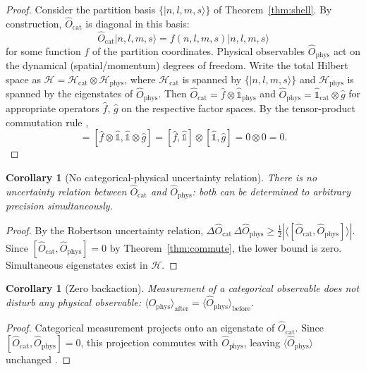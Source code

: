 \documentclass[10pt,twocolumn]{article}
\newtheorem{corollary}[theorem]{Corollary}
\theoremstyle{definition}
\theoremstyle{remark}
\newcommand{\Hil}{\mathcal{H}}
\newcommand{\Ocat}{\hat{O}_{\mathrm{cat}}}
\newcommand{\Ophys}{\hat{O}_{\mathrm{phys}}}
\begin{document}
\begin{proof}
Consider the partition basis
$\{|n,l,m,s\rangle\}$ of Theorem~\ref{thm:shell}.  By
construction, $\Ocat$ is diagonal in this basis:
\begin{equation}
  \Ocat|n,l,m,s\rangle = f(n,l,m,s)|n,l,m,s\rangle
\end{equation}
for some function $f$ of the partition coordinates.  Physical
observables $\Ophys$ act on the dynamical (spatial/momentum)
degrees of freedom.  Write the total Hilbert space as
$\Hil = \Hil_{\mathrm{cat}}\otimes\Hil_{\mathrm{phys}}$,
where $\Hil_{\mathrm{cat}}$ is spanned by
$\{|n,l,m,s\rangle\}$ and $\Hil_{\mathrm{phys}}$ is spanned
by the eigenstates of $\Ophys$.  Then
$\Ocat = \hat{f}\otimes\hat{\mathbb{1}}_{\mathrm{phys}}$ and
$\Ophys =
\hat{\mathbb{1}}_{\mathrm{cat}}\otimes\hat{g}$ for
appropriate operators $\hat{f}$, $\hat{g}$ on the respective
factor spaces.  By the tensor-product commutation rule
\citep{vonNeumann1932},
\begin{equation}
  [\Ocat,\Ophys]
  = [\hat{f}\otimes\hat{\mathbb{1}},
     \hat{\mathbb{1}}\otimes\hat{g}]
  = [\hat{f},\hat{\mathbb{1}}]\otimes
    [\hat{\mathbb{1}},\hat{g}]
  = 0\otimes 0 = 0.
\end{equation}
\end{proof}

\begin{corollary}[No categorical-physical uncertainty relation]
\label{cor:no_uncert}
There is no uncertainty relation between $\Ocat$ and $\Ophys$:
both can be determined to arbitrary precision simultaneously.
\end{corollary}

\begin{proof}
By the Robertson uncertainty relation, $\Delta\Ocat\,\Delta\Ophys
\ge \tfrac{1}{2}|\langle[\Ocat,\Ophys]\rangle|$.  Since
$[\Ocat,\Ophys]=0$ by Theorem~\ref{thm:commute}, the lower
bound is zero.  Simultaneous eigenstates exist in $\Hil$.
\end{proof}

\begin{corollary}[Zero backaction]\label{cor:backaction}
Measurement of a categorical observable does not disturb any
physical observable:
$\langle\Ophys\rangle_{\text{after}} =
\langle\Ophys\rangle_{\text{before}}$.
\end{corollary}

\begin{proof}
Categorical measurement projects onto an eigenstate of
$\Ocat$.  Since $[\Ocat,\Ophys]=0$, this projection commutes
with $\Ophys$, leaving $\langle\Ophys\rangle$ unchanged
\citep{Braginsky1980}.
\end{proof}
\end{document}

